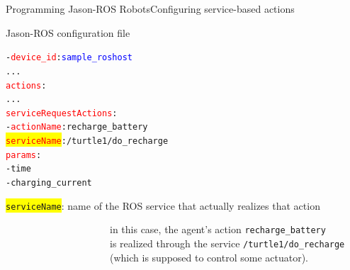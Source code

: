 \documentclass[compress]{beamer}
\newcommand{\yamlkey}[1]{\textcolor{red}{\texttt{#1}}}
\newcommand{\yamlvalue}[1]{\textcolor{blue}{\texttt{#1}}}
\begin{document}
\begin{frame}[fragile]{Programming Jason-ROS Robots}{Configuring service-based actions}{}


\footnotesize
%
    

 
\begin{block}{Jason-ROS configuration file}


\scriptsize
\begin{alltt}\scriptsize
- \yamlkey{device_id}: \yamlvalue{sample_roshost}
     ...
  \yamlkey{actions}:        
        ...
     \yamlkey{serviceRequestActions}:
        - \yamlkey{actionName}: recharge_battery
          \colorbox{yellow}{\yamlkey{serviceName}}: /turtle1/do_recharge
          \yamlkey{params}:
             - time
             - charging_current
\end{alltt}
    
\end{block}  

 
 \colorbox{yellow}{\texttt{serviceName}}: name of the ROS service that actually realizes that action\\
 
 \vspace{-.5cm}
 
 \ \ \ \ \ \ \ \ \ \ \ \ \ \ \ \ \ \ \ \ \ {\tiny in this case, the agent's action \texttt{recharge\_battery}}\\ 
 
 \vspace{-.5cm}
 \ \ \ \ \ \ \ \ \ \ \ \ \ \ \ \ \ \ \ \ \ {\tiny is realized through the service \texttt{/turtle1/do\_recharge}}\\ 
 
 \vspace{-.5cm}
 \ \ \ \ \ \ \ \ \ \ \ \ \ \ \ \ \ \ \ \ \ {\tiny (which is supposed to control some actuator).}
 

\scriptsize

\end{frame}
\end{document}
